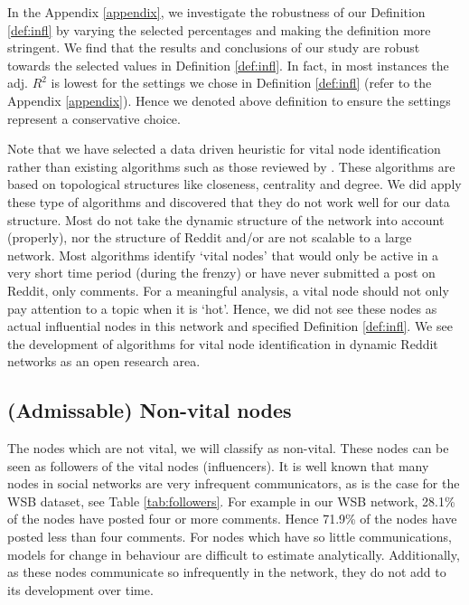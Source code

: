 
In the Appendix \ref{appendix}, we investigate the robustness of our Definition \ref{def:infl} by varying the selected percentages and making the definition more stringent. We find that the results and conclusions of our study are robust towards the selected values in Definition \ref{def:infl}. In fact, in most instances the adj. $R^2$ is lowest for the settings we chose in Definition \ref{def:infl} (refer to the Appendix \ref{appendix}). Hence we denoted above definition to ensure the settings represent a conservative choice. 

Note that we have selected a data driven heuristic for vital node identification rather than existing algorithms such as those reviewed by \citet{lu2016vital}. These algorithms are based on topological structures like closeness, centrality and degree. We did apply these type of algorithms and discovered that they do not work well for our data structure. Most do not take the dynamic structure of the network into account (properly), nor the structure of Reddit and/or are not scalable to a large network. Most algorithms identify `vital nodes' that would only be active in a very short time period (during the frenzy) or have never submitted a post on Reddit, only comments. For a meaningful analysis, a vital node should not only pay attention to a topic when it is `hot'. Hence, we did not see these nodes as actual influential nodes in this network and specified Definition \ref{def:infl}. We see the development of algorithms for vital node identification in dynamic Reddit networks as an open research area. 

\subsection{(Admissable) Non-vital nodes} \label{sec:nvn}
The nodes which are not vital, we will classify as non-vital. These nodes can be seen as followers of the vital nodes (influencers). It is well known that many nodes in social networks are very infrequent communicators, as is the case for the WSB dataset, see Table \ref{tab:followers}. For example in our WSB network, 28.1\% of the nodes have posted four or more comments. Hence 71.9\% of the nodes have posted less than four comments. For nodes which have so little communications, models for change in behaviour are difficult to estimate analytically. Additionally, as these nodes communicate so infrequently in the network, they do not add to its development over time.

